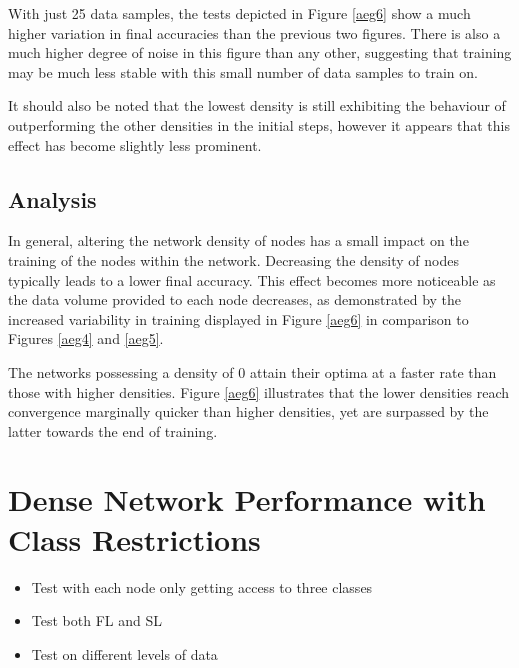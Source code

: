 With just 25 data samples, the tests depicted in Figure \ref{aeg6} show a much higher variation in final accuracies than the previous two figures. There is also a much higher degree of noise in this figure than any other, suggesting that training may be much less stable with this small number of data samples to train on.

It should also be noted that the lowest density is still exhibiting the behaviour of outperforming the other densities in the initial steps, however it appears that this effect has become slightly less prominent.

\subsection{Analysis}
In general, altering the network density of nodes has a small impact on the training of the nodes within the network. Decreasing the density of nodes typically leads to a lower final accuracy. This effect becomes more noticeable as the data volume provided to each node decreases, as demonstrated by the increased variability in training displayed in Figure \ref{aeg6} in comparison to Figures \ref{aeg4} and \ref{aeg5}.

The networks possessing a density of 0 attain their optima at a faster rate than those with higher densities. Figure \ref{aeg6} illustrates that the lower densities reach convergence marginally quicker than higher densities, yet are surpassed by the latter towards the end of training.

\section{Dense Network Performance with Class Restrictions}

\begin{itemize}
	\item Test with each node only getting access to three classes
	\item Test both FL and SL
	\item Test on different levels of data
\end{itemize}